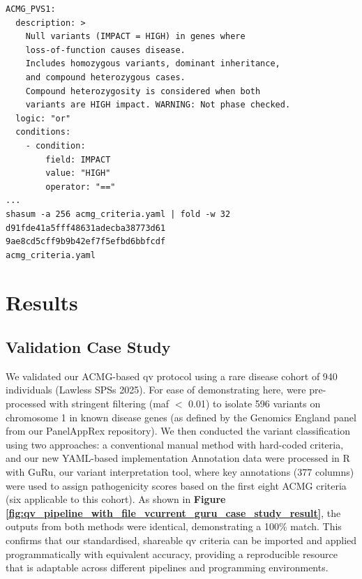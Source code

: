 \begin{tcolorbox}[
    colback=white!0,
    colframe=black,
    boxrule=1pt,
    arc=1mm,
    outer arc=1mm,
    title=\textbf{\refstepcounter{myboxcounter}\label{box:acmg_criteria_yaml}Box \themyboxcounter: qv\_files/acmg\_criteria.yaml}
]
\begin{verbatim}
ACMG_PVS1:
  description: >
    Null variants (IMPACT = HIGH) in genes where 
    loss-of-function causes disease.
    Includes homozygous variants, dominant inheritance, 
    and compound heterozygous cases.
    Compound heterozygosity is considered when both 
    variants are HIGH impact. WARNING: Not phase checked.
  logic: "or"
  conditions:
    - condition:
        field: IMPACT
        value: "HIGH"
        operator: "=="
...
shasum -a 256 acmg_criteria.yaml | fold -w 32
d91fde41a5fff48631adecba38773d61
9ae8cd5cff9b9b42ef7f5efbd6bbfcdf
acmg_criteria.yaml
\end{verbatim}
\end{tcolorbox}


\section{Results}
\subsection{Validation Case Study}

We validated our ACMG-based \ac{qv} protocol using a rare disease cohort of 940 individuals (Lawless SPSs 2025). For ease of demonstrating here, were pre-processed with stringent filtering (\ac{maf} $<$ 0.01) to isolate 596 variants on chromosome 1 in known disease genes (as defined by the Genomics England panel from our PanelAppRex repository). 
We then conducted the variant classification using two approaches: a conventional manual method with hard-coded criteria, and our new YAML-based implementation
Annotation data were processed in R with GuRu, our variant interpretation tool, where key annotations (377 columns) were used to assign pathogenicity scores based on the first eight ACMG criteria (six applicable to this cohort).
As shown in \textbf{Figure \ref{fig:qv_pipeline_with_file_vcurrent_guru_case_study_result}}, 
the outputs from both methods were identical, demonstrating a 100\% match. This confirms that our standardised, shareable \ac{qv} criteria can be imported and applied programmatically with equivalent accuracy, providing a reproducible resource that is adaptable across different pipelines and programming environments.

